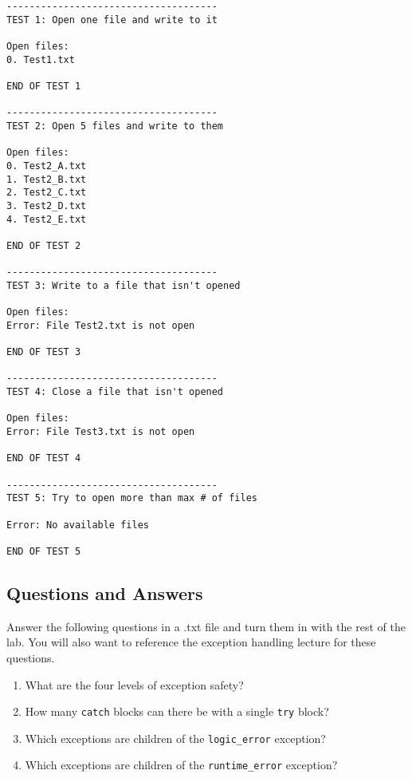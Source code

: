 \documentclass[a4paper,12pt]{book}
\begin{document}
\begin{lstlisting}[style=output]
-------------------------------------
TEST 1: Open one file and write to it

Open files: 
0. Test1.txt

END OF TEST 1

-------------------------------------
TEST 2: Open 5 files and write to them

Open files: 
0. Test2_A.txt
1. Test2_B.txt
2. Test2_C.txt
3. Test2_D.txt
4. Test2_E.txt

END OF TEST 2

-------------------------------------
TEST 3: Write to a file that isn't opened

Open files: 
Error: File Test2.txt is not open

END OF TEST 3

-------------------------------------
TEST 4: Close a file that isn't opened

Open files: 
Error: File Test3.txt is not open

END OF TEST 4

-------------------------------------
TEST 5: Try to open more than max # of files

Error: No available files

END OF TEST 5
\end{lstlisting}

           
        \newpage
        \subsection*{Questions and Answers}
            Answer the following questions in a .txt file and
            turn them in with the rest of the lab.
            You will also want to reference the exception handling
            lecture for these questions.

            \begin{enumerate}
                \item What are the four levels of exception safety?
                \item How many \texttt{catch} blocks can there be
                    with a single \texttt{try} block?
                \item Which exceptions are children of the \texttt{logic\_error} exception?
                \item Which exceptions are children of the \texttt{runtime\_error} exception?
            \end{enumerate}
\end{document}
